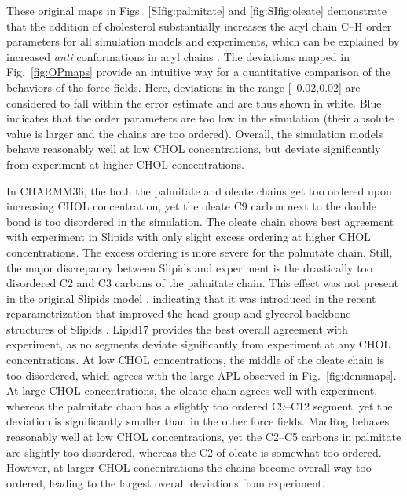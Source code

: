\documentclass[journal=jctcce]{achemso}
\begin{document}
These original maps in Figs.~\ref{SIfig:palmitate} and \ref{fig:SIfig:oleate} demonstrate that the addition of cholesterol substantially increases the acyl chain C--H order parameters for all simulation models and experiments, which can be explained by increased \textit{anti} conformations in acyl chains \cite{ferreira13,??}. 
The deviations mapped in Fig.~\ref{fig:OPmaps} provide an intuitive way for a quantitative comparison of the behaviors of the force fields. Here, deviations in the range [--0.02,0.02] are considered to fall within the error estimate and are thus shown in white. Blue indicates that the order parameters are too low in the simulation (their absolute value is larger and the chains are too ordered). Overall, the simulation models behave reasonably well at low CHOL concentrations, but deviate significantly from experiment at higher CHOL concentrations. 

In CHARMM36, the both the palmitate and oleate chains get too ordered upon increasing CHOL concentration, yet the oleate C9 carbon next to the double bond is too disordered in the simulation. The oleate chain shows best agreement with experiment in Slipids with only slight excess ordering at higher CHOL concentrations. The excess ordering is more severe for the palmitate chain. Still, the major discrepancy between Slipids and experiment is the drastically too disordered C2 and C3 carbons of the palmitate chain. This effect was not present in the original Slipids model \cite{botan15}, indicating that it was introduced in the recent reparametrization that improved the head group and glycerol backbone structures of Slipids \cite{grote2020optimization}. Lipid17 provides the best overall agreement with experiment, as no segments deviate significantly from experiment at any CHOL concentrations. At low CHOL concentrations, the middle of the oleate chain is too disordered, which agrees with the large APL observed in Fig.~\ref{fig:densmaps}. At large CHOL concentrations, the oleate chain agrees well with experiment, whereas the palmitate chain has a slightly too ordered C9--C12 segment, yet the deviation is significantly smaller than in the other force fields. MacRog behaves reasonably well at low CHOL concentrations, yet the C2--C5 carbons in palmitate are slightly too disordered, whereas the C2 of oleate is somewhat too ordered. However, at larger CHOL concentrations the chains become overall way too ordered, leading to the largest overall deviations from experiment.
\end{document}
